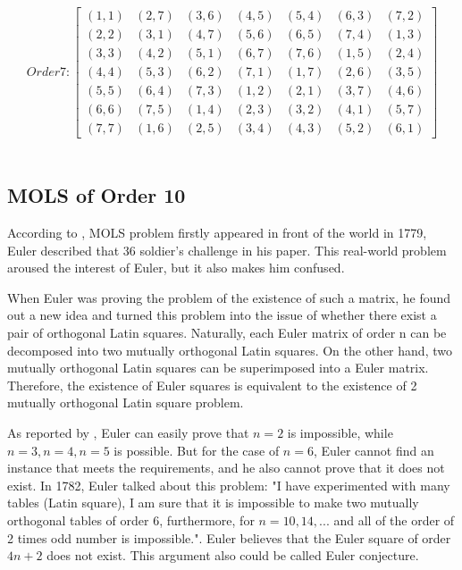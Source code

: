\documentclass[12pt]{article}
\begin{document}
\[Order 7:\begin{bmatrix}(1,1) & (2,7) & (3,6) & (4,5) & (5,4) & (6,3) & (7,2)\\
                         (2,2) & (3,1) & (4,7) & (5,6) & (6,5) & (7,4) & (1,3)\\
                         (3,3) & (4,2) & (5,1) & (6,7) & (7,6) & (1,5) & (2,4)\\
                         (4,4) & (5,3) & (6,2) & (7,1) & (1,7) & (2,6) & (3,5)\\
                         (5,5) & (6,4) & (7,3) & (1,2) & (2,1) & (3,7) & (4,6)\\
                         (6,6) & (7,5) & (1,4) & (2,3) & (3,2) & (4,1) & (5,7)\\
                         (7,7) & (1,6) & (2,5) & (3,4) & (4,3) & (5,2) & (6,1) \end{bmatrix} \]\\


\subsection{MOLS of Order 10}
According to \cite{ref9}, MOLS problem firstly appeared in front of the world in 1779, Euler described that 36 soldier’s challenge in his paper. This real-world problem aroused the interest of Euler, but it also makes him confused. 

When Euler was proving the problem of the existence of such a matrix, he found out a new idea and turned this problem into the issue of whether there exist a pair of orthogonal Latin squares. Naturally, each Euler matrix of order n can be decomposed into two mutually orthogonal Latin squares. On the other hand, two mutually orthogonal Latin squares can be superimposed into a Euler matrix. Therefore, the existence of Euler squares is equivalent to the existence of 2 mutually orthogonal Latin square problem.

As reported by \cite{ref9}, Euler can easily prove that $n = 2$ is impossible, while $n = 3, n = 4, n = 5$ is possible. But for the case of $n = 6$, Euler cannot find an instance that meets the requirements, and he also cannot prove that it does not exist. In 1782, Euler talked about this problem: "I have experimented with many tables (Latin square), I am sure that it is impossible to make two mutually orthogonal tables of order 6, furthermore, for $n=10, 14, ...$ and all of the order of 2 times odd number is impossible.". Euler believes that the Euler square of order $4n + 2$ does not exist. This argument also could be called Euler conjecture.\\
\end{document}
